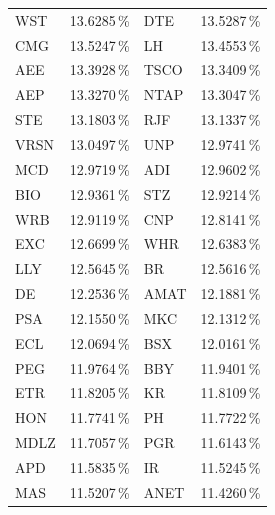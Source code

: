 \begin{longtable}{l c | l c}
    WST    & 13.6285\,\%            & DTE    & 13.5287\,\%                                   \\
    CMG    & 13.5247\,\%            & LH     & 13.4553\,\%                                   \\
    AEE    & 13.3928\,\%            & TSCO   & 13.3409\,\%                                   \\
    AEP    & 13.3270\,\%            & NTAP   & 13.3047\,\%                                   \\
    STE    & 13.1803\,\%            & RJF    & 13.1337\,\%                                   \\
    VRSN   & 13.0497\,\%            & UNP    & 12.9741\,\%                                   \\
    MCD    & 12.9719\,\%            & ADI    & 12.9602\,\%                                   \\
    BIO    & 12.9361\,\%            & STZ    & 12.9214\,\%                                   \\
    WRB    & 12.9119\,\%            & CNP    & 12.8141\,\%                                   \\
    EXC    & 12.6699\,\%            & WHR    & 12.6383\,\%                                   \\
    LLY    & 12.5645\,\%            & BR     & 12.5616\,\%                                   \\
    DE     & 12.2536\,\%            & AMAT   & 12.1881\,\%                                   \\
    PSA    & 12.1550\,\%            & MKC    & 12.1312\,\%                                   \\
    ECL    & 12.0694\,\%            & BSX    & 12.0161\,\%                                   \\
    PEG    & 11.9764\,\%            & BBY    & 11.9401\,\%                                   \\
    ETR    & 11.8205\,\%            & KR     & 11.8109\,\%                                   \\
    HON    & 11.7741\,\%            & PH     & 11.7722\,\%                                   \\
    MDLZ   & 11.7057\,\%            & PGR    & 11.6143\,\%                                   \\
    APD    & 11.5835\,\%            & IR     & 11.5245\,\%                                   \\
    MAS    & 11.5207\,\%            & ANET   & 11.4260\,\%                                   \\

\end{longtable}
